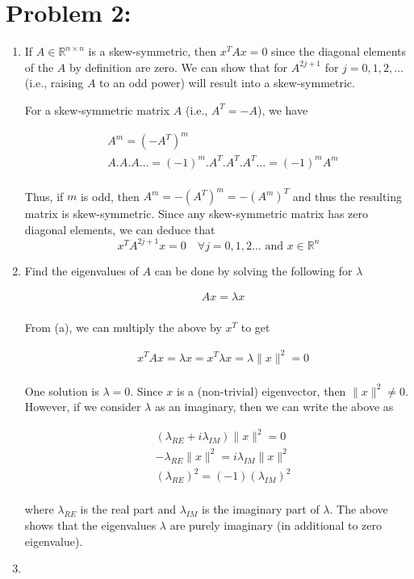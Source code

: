\newpage
\section*{Problem 2:}
\begin{enumerate}
\item If $A \in \mathbb{R}^{n\times n}$ is a skew-symmetric, then $x^{T}Ax =0$ since the diagonal elements of the $A$ by definition are zero. We can show that for $A^{2j+1}$ for $j=0,1,2, \dots$ (i.e., raising $A$ to an odd power) will result into a skew-symmetric. 

For a skew-symmetric matrix $A$ (i.e., $A^{T} = -A$), we have 

\begin{align*}
& A^{m} = (-A^{T})^{m}  \\
& A.A.A\dots=(-1)^{m}.A^{T}.A^{T}.A^{T}\dots =(-1)^{m}A^{m} \\
\end{align*}


Thus, if $m$ is odd, then $A^{m} = -(A^{T})^{m} = -(A^{m})^{T}$ and thus the resulting matrix is skew-symmetric. Since any skew-symmetric matrix has zero diagonal elements, we can deduce that 
$$
x^{T}A^{2j+1}x = 0\quad \forall j=0,1,2\dots \text{ and } x\in \mathbb{R}^{n}
$$

\item Find the eigenvalues of $A$ can be done by solving the following for $\lambda$

\begin{align*}
&Ax = \lambda x\\
\end{align*}

From (a), we can multiply the above by $x^{T}$ to get 

\begin{align*}
& x^{T}Ax = \lambda x = x^{T}\lambda x = \lambda \parallel x \parallel^{2} = 0\\
\end{align*}

One solution is $\lambda = 0$. Since $x$ is a (non-trivial) eigenvector, then $\parallel x \parallel^{2} \neq 0$. However, if we consider $\lambda$ as an imaginary, then we can write the above as

\begin{align*}
& (\lambda_{RE} + i \lambda_{IM})  \parallel x \parallel^{2} = 0\\
& -\lambda_{RE}\parallel x \parallel^{2} = i \lambda_{IM}\parallel x \parallel^{2}\\ 
& \left(\lambda_{RE}\right)^{2} = (-1) \left(\lambda_{IM}\right)^{2}\\ 
\end{align*}

where $\lambda_{RE}$ is the real part and $\lambda_{IM}$ is the imaginary part of $\lambda$. The above shows that the eigenvalues $\lambda$ are purely imaginary (in additional to zero eigenvalue).

\item 




\end{enumerate}